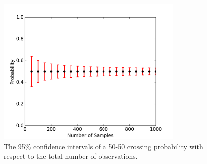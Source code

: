         \begin{figure}[htbp]
        \begin{center}
            \includegraphics[width=0.8\textwidth]{Figures/bootRho}
            \caption{The 95\% confidence intervals of a 50-50 crossing probability with respect to the total number of observations.}
            \label{fig:bootRho}
        \end{center}
        \end{figure}
